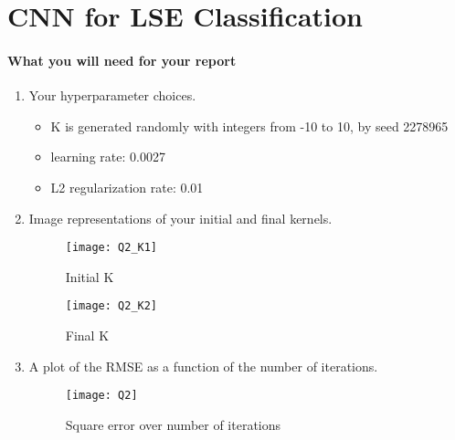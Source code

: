 \documentclass[12pt]{article}
\begin{document}
\newpage
\section{CNN for LSE Classification}\label{LSE}

\paragraph{What you will need for your report}
\begin{enumerate}
\item Your hyperparameter choices.
\begin{itemize}
\item[]K is generated randomly with integers from -10 to 10, by seed 2278965
\item[]learning rate: 0.0027
\item[]L2 regularization rate: 0.01
\end{itemize}

\item Image representations of your initial and final kernels.

\begin{figure}[H]
\centering
\texttt{[image: Q2\_K1]}
\caption{Initial K}
\end{figure} 

\begin{figure}[H]
\centering
\texttt{[image: Q2\_K2]}
\caption{Final K}
\end{figure} 

\item A plot of the RMSE as a function of the number of iterations.
\begin{figure}[H]
\centering
\texttt{[image: Q2]}
\caption{Square error over number of iterations}
\end{figure} 


\end{enumerate}

\newpage
\end{document}
